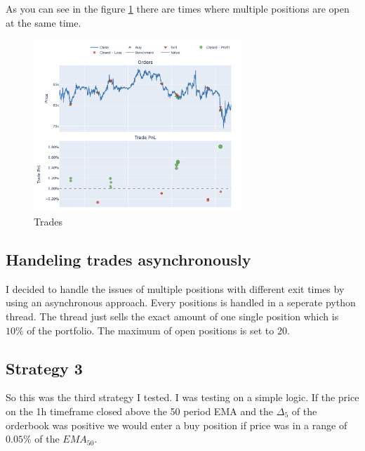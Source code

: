 \documentclass[12pt]{article}
\begin{document}
As you can see in the figure \ref{fig:trades} there are times where multiple positions are open at the same time.
\begin{figure}[H]
  \centering
  \includegraphics[width=0.7\textwidth]{imgs/tradesVisualised.png}
  \caption{Trades}
  \label{fig:trades}
\end{figure}



\subsection{Handeling trades asynchronously}
I decided to handle the issues of multiple positions with different exit times by using an asynchronous approach. Every positions is handled in a seperate python thread. The thread just sells the exact amount of one single position which is $10\%$ of the portfolio. The maximum of open positions is set to 20.






\newpage
\subsection{Strategy 3}
So this was the third strategy I tested. I was testing on a simple logic. If the price on the 1h timeframe closed above the 50 period EMA and the $\Delta_5$ of the orderbook was positive we would enter a buy position if price was in a range of $0.05\%$ of the $EMA_50$.




\newpage
\end{document}
